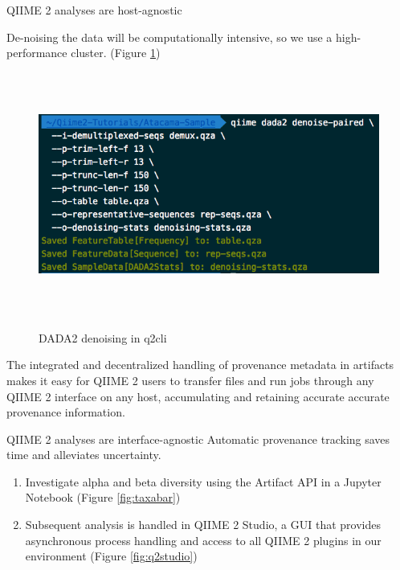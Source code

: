 \documentclass[final]{beamer}
\newlength{\colwidth}
\begin{document}
\begin{frame}[t]
\begin{columns}[t]
\begin{column}{\colwidth}
  \begin{block}{QIIME 2 analyses are host-agnostic}

    De-noising the data will be computationally intensive, so we use a
    high-performance cluster. (Figure \ref{fig:dada2})

    \begin{figure}[tph!]
      {\includegraphics[width=18cm, height=8cm]{assets/dada2}}
      \caption{DADA2 denoising in q2cli}
      \label{fig:dada2}
    \end{figure}

    \begin{tcolorbox}
    [width=\textwidth, colframe=blue]
    {The integrated and decentralized handling of provenance metadata in
    artifacts makes it easy for QIIME 2 users to transfer files and run jobs
    through any QIIME 2 interface on any host, accumulating and retaining
    accurate accurate provenance information}.
  \end{tcolorbox}

  \end{block}

  \begin{block}{QIIME 2 analyses are interface-agnostic}
    Automatic provenance tracking saves time and alleviates uncertainty.

    \begin{enumerate}
      \item Investigate alpha and beta diversity using the Artifact API in
      a Jupyter Notebook \cite{PER-GRA:2007} (Figure \ref{fig:taxabar})
      \item Subsequent analysis is handled in QIIME 2 Studio, a GUI
      that provides asynchronous process handling and access to all
      QIIME 2 plugins in our environment (Figure \ref{fig:q2studio})
    \end{enumerate}


\end{block}
\end{column}
\end{columns}
\end{frame}
\end{document}
